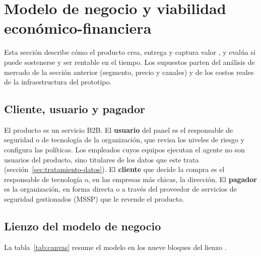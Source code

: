 \chapter{Modelo de negocio y viabilidad económico-financiera}\label{chap:negocio}
Esta sección describe cómo el producto crea, entrega y captura valor \parencite{Osterwalder2010},
y evalúa si puede sostenerse y ser rentable en el tiempo. Los supuestos parten del análisis de
mercado de la sección anterior (segmento, precio y canales) y de los costos reales de la
infraestructura del prototipo.

\section{Cliente, usuario y pagador}
El producto es un servicio B2B. El \textbf{usuario} del panel es el responsable de seguridad o de
tecnología de la organización, que revisa los niveles de riesgo y configura las políticas. Los
empleados cuyos equipos ejecutan el agente no son usuarios del producto, sino titulares de los
datos que este trata (sección~\ref{sec:tratamiento-datos}). El \textbf{cliente} que decide la
compra es el responsable de tecnología o, en las empresas más chicas, la dirección. El
\textbf{pagador} es la organización, en forma directa o a través del proveedor de servicios de
seguridad gestionados (MSSP) que le revende el producto.

\section{Lienzo del modelo de negocio}
La tabla~\ref{tab:canvas} resume el modelo en los nueve bloques del lienzo
\parencite{Osterwalder2010}.


